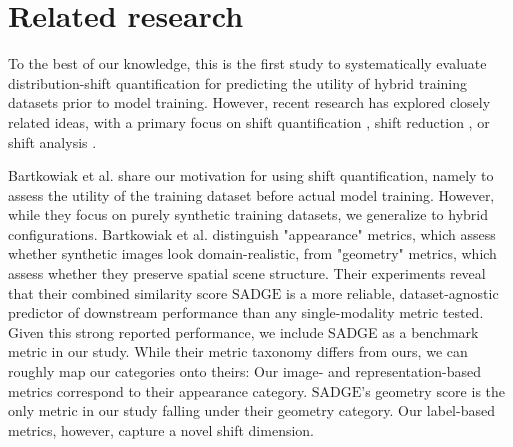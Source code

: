 \documentclass[conference]{IEEEtran}
\begin{document}
\clearpage
\appendices
\section{Related research}
\label{sec:related_work}
To the best of our knowledge, this is the first study to systematically evaluate distribution-shift quantification for predicting the utility of hybrid training datasets prior to model training. However, recent research has explored closely related ideas, with a primary focus on shift quantification \cite{bartkowiak2026, DetectShift, duminil2024, duminil2025, shiftForModelUtility, renza2024, dale2024, li2025}, shift reduction \cite{abramov2020, liu2022_labelShift, zhang2020}, or shift analysis \cite{urbansyn}.

Bartkowiak et al. \cite{bartkowiak2026} share our motivation for using shift quantification, namely to assess the utility of the training dataset before actual model training. However, while they focus on purely synthetic training datasets, we generalize to hybrid configurations. Bartkowiak et al. distinguish "appearance" metrics, which assess whether synthetic images look domain-realistic, from "geometry" metrics, which assess whether they preserve spatial scene structure. Their experiments reveal that their combined similarity score $\text{SADGE}$ is a more reliable, dataset-agnostic predictor of downstream performance than any single-modality metric tested. Given this strong reported performance, we include SADGE as a benchmark metric in our study. 
While their metric taxonomy differs from ours, we can roughly map our categories onto theirs: Our image- and representation-based metrics correspond to their appearance category. $\text{SADGE}$'s geometry score is the only metric in our study falling under their geometry category. Our label-based metrics, however, capture a novel shift dimension. 
\end{document}
